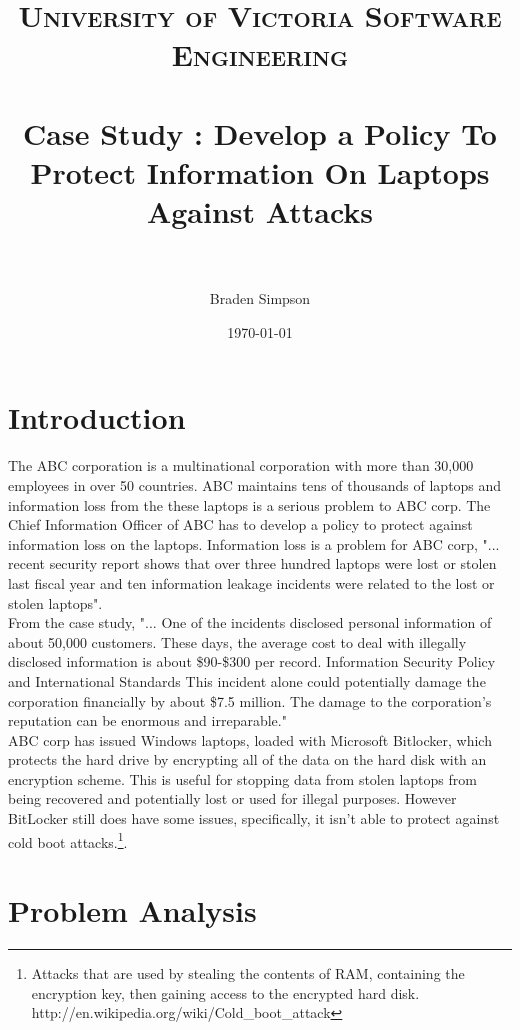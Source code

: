 \documentclass[paper=a4, fontsize=11pt]{scrartcl} %
\title{	
\normalfont \normalsize 
\textsc{University of Victoria Software Engineering} \\ [25pt] %
\horrule{0.5pt} \\[0.4cm] %
\huge Case Study : Develop a Policy To Protect Information On Laptops Against Attacks  \\ %
\horrule{2pt} \\[0.5cm] %
}
\author{Braden Simpson} %
\date{\normalsize\today} %
\numberwithin{equation}{section} %
\numberwithin{figure}{section} %
\numberwithin{table}{section} %
\begin{document}
\maketitle %


\section{Introduction}
\label{sec:intro}

The ABC corporation is a multinational corporation with more than 30,000 employees in over 50 countries.  ABC maintains tens of thousands of laptops and information loss from the these laptops is a serious problem to ABC corp.  The Chief Information Officer of ABC has to develop a policy to protect against information loss on the laptops.  Information loss is a problem for ABC corp, "...  recent security report shows that over three 
hundred laptops were lost or stolen last fiscal year and ten information leakage incidents 
were related to the lost or stolen laptops".\\

From the case study, "... One of the incidents disclosed personal information of about 50,000 customers. These days, 
the average cost to deal with illegally disclosed information is about \$90-\$300 per record. Information Security Policy and International Standards This incident alone could potentially damage the corporation financially by about \$7.5 million. The damage to the corporation's reputation can be enormous and irreparable."\\  

ABC corp has issued Windows laptops, loaded with Microsoft Bitlocker, which protects the hard drive by encrypting all of the data on the hard disk with an encryption scheme.  This is useful for stopping data from stolen laptops from being recovered and potentially lost or used for illegal purposes.  However BitLocker still does have some issues, specifically, it isn't able to protect against cold boot attacks.\footnote{Attacks that are used by stealing the contents of RAM, containing the encryption key, then gaining access to the encrypted hard disk.  http://en.wikipedia.org/wiki/Cold\_boot\_attack}.\\

\section{Problem Analysis}
\label{sec:analysis}
\end{document}
